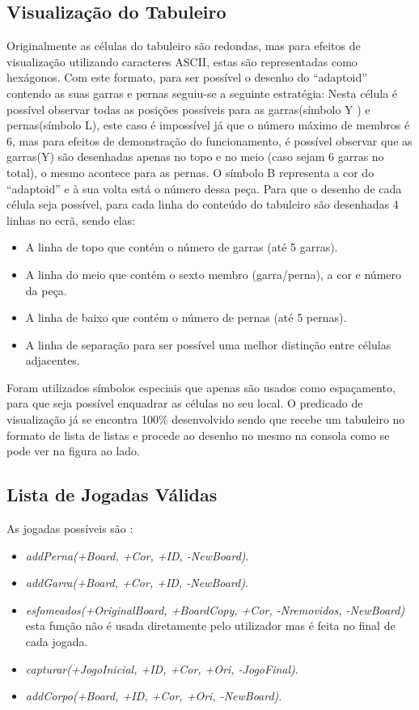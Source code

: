 \documentclass[a4paper]{article}
\begin{document}
\subsection{Visualização do Tabuleiro} Originalmente as células do tabuleiro são redondas, mas para efeitos de visualização utilizando caracteres ASCII, estas são representadas como hexágonos. Com este formato, para ser possível o desenho do “adaptoid” contendo as suas garras e pernas seguiu-se a seguinte estratégia: Nesta célula é possível observar todas as posições possíveis para as garras(símbolo Y ) e pernas(símbolo L), este caso é impossível já que o número máximo de membros é 6, mas para efeitos de demonstração do funcionamento, é possível observar que as garras(Y) são desenhadas apenas no topo e no meio (caso sejam 6 garras no total), o mesmo acontece para as pernas. O símbolo B representa a cor do “adaptoid” e à sua volta está o número dessa peça.
Para que o desenho de cada célula seja possível, para cada linha do conteúdo do tabuleiro são desenhadas 4 linhas no ecrã, sendo elas:
\begin{itemize}
    \item A linha de topo que contém o número de garras (até 5 garras).
    \item A linha do meio que contém o sexto membro (garra/perna), a cor e  número da peça.
    \item A linha de baixo que contém o número de pernas (até 5 pernas).
    \item A linha de separação para ser possível uma melhor distinção entre células adjacentes.
\end{itemize}
Foram utilizados símbolos especiais que apenas são usados como espaçamento, para que seja possível enquadrar as células no seu local. O predicado de visualização já se encontra 100\% desenvolvido sendo que recebe um tabuleiro no formato de lista de listas e procede ao desenho no mesmo na consola como se pode ver na figura ao lado.

\subsection{Lista de Jogadas Válidas} As jogadas possíveis são :

\begin{itemize}
    \item \textit{addPerna(+Board, +Cor, +ID, -NewBoard)}.
    \item \textit{addGarra(+Board, +Cor, +ID, -NewBoard)}.
    \item \textit{esfomeados(+OriginalBoard, +BoardCopy, +Cor, -Nremovidos, -NewBoard)} esta função não é usada diretamente pelo utilizador mas é feita no final de cada jogada.
    \item \textit{capturar(+JogoInicial, +ID, +Cor, +Ori, -JogoFinal)}.
    \item \textit{addCorpo(+Board, +ID, +Cor, +Ori, -NewBoard)}.
\end{itemize}
\end{document}
